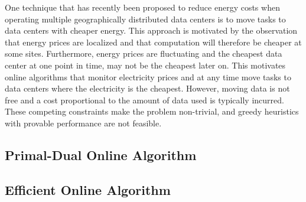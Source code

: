 One technique that has recently been proposed to reduce energy costs when operating multiple geographically distributed data centers is to move tasks to data centers with cheaper energy.
This approach is motivated by the observation that energy prices are localized and that computation will therefore be cheaper at some sites.
Furthermore, energy prices are fluctuating and the cheapest data center at one point in time, may not be the cheapest later on.
This motivates online algorithms that monitor electricity prices and at any time move tasks to data centers where the electricity is the cheapest.
However, moving data is not free and a cost proportional to the amount of data used is typically incurred.
These competing constraints make the problem non-trivial, and greedy heuristics with provable performance are not feasible.




\subsection{Primal-Dual Online Algorithm}



\subsection{Efficient Online Algorithm}


